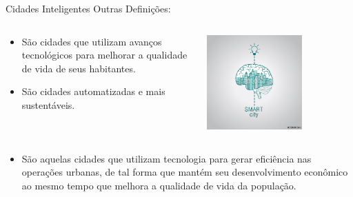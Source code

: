 \documentclass{beamer}
\begin{document}
\begin{frame}{Cidades Inteligentes}
Outras Definições:




\begin{columns}
\begin{column}{0.7\textwidth}
\begin{itemize}
 \item São cidades que utilizam avanços tecnológicos para melhorar a qualidade de vida de seus habitantes.
 \item São cidades automatizadas e mais sustentáveis.
\end{itemize}
\end{column}
\begin{column}{0.3\textwidth}  %
    \begin{center}
     \includegraphics[width=0.65\textwidth]{img/smart-city.jpg}
     \end{center}
\end{column}
\end{columns}



\begin{columns}
\begin{column}{1\textwidth}
   \begin{itemize}
 \item São aquelas cidades que utilizam tecnologia para gerar eficiência nas operações urbanas, de tal forma que mantém seu desenvolvimento 
  econômico ao mesmo tempo que melhora a qualidade de vida da população.

\end{itemize}
\end{column}
\end{columns}

\end{frame}
\end{document}
